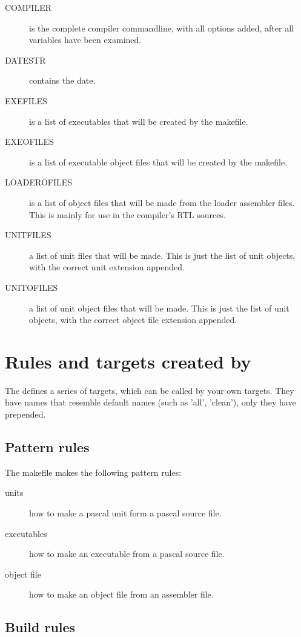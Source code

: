 \documentclass{report}
\begin{document}
\begin{description}
\item[COMPILER] is the complete compiler commandline, with all options
added, after all  variables have been examined.
\item[DATESTR] contains the date.
\item[EXEFILES] is a list of executables that will be created by the
makefile.
\item[EXEOFILES] is a list of executable object files that will be created
by the makefile.
\item[LOADEROFILES] is a list of object files that will be made from the
loader assembler files. This is mainly for use in the compiler's RTL sources.
\item[UNITFILES] a list of unit files that will be made. This is just
the list of unit objects, with the correct unit extension appended.
\item[UNITOFILES] a list of unit object files that will be made.
This is just the list of unit objects, with the correct object file
extension appended.
\end{description}

\section{Rules and targets created by }

The  defines a series of targets, which can be called by
your own targets. They have names that resemble default names (such as
'all', 'clean'), only they have  prepended.

\subsection{Pattern rules}

The makefile makes the following pattern rules:
\begin{description}
\item[units] how to make a pascal unit form a pascal source file.
\item[executables] how to make an executable from a pascal source file.
\item[object file] how to make an object file from an assembler file.
\end{description}

\subsection{Build rules}
\end{document}
